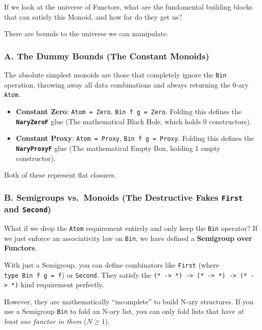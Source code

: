 \documentclass[
]{article}
\providecommand{\tightlist}{%
  \setlength{\itemsep}{0pt}\setlength{\parskip}{0pt}}
\begin{document}
If we look at the universe of Functors, what are the fundamental
building blocks that can satisfy this Monoid, and how far do they get
us?

There are bounds to the universe we can manipulate.

\subsubsection{A. The Dummy Bounds (The Constant
Monoids)}\label{a.-the-dummy-bounds-the-constant-monoids}

The absolute simplest monoids are those that completely ignore the
\texttt{Bin} operation, throwing away all data combinations and always
returning the 0-ary \texttt{Atom}.

\begin{itemize}
\tightlist
\item
  \textbf{Constant Zero}: \texttt{Atom\ =\ Zero},
  \texttt{Bin\ f\ g\ =\ Zero}. Folding this defines the
  \textbf{\texttt{NaryZeroF}} glue (The mathematical Black Hole, which
  holds 0 constructors).
\item
  \textbf{Constant Proxy}: \texttt{Atom\ =\ Proxy},
  \texttt{Bin\ f\ g\ =\ Proxy}. Folding this defines the
  \textbf{\texttt{NaryProxyF}} glue (The mathematical Empty Box, holding
  1 empty constructor).
\end{itemize}

Both of these represent flat closures.

\subsubsection{\texorpdfstring{B. Semigroups vs.~Monoids (The
Destructive Fakes \texttt{First} and
\texttt{Second})}{B. Semigroups vs.~Monoids (The Destructive Fakes First and Second)}}\label{b.-semigroups-vs.-monoids-the-destructive-fakes-first-and-second}

What if we drop the \texttt{Atom} requirement entirely and only keep the
\texttt{Bin} operator? If we just enforce an associativity law on
\texttt{Bin}, we have defined a \textbf{Semigroup over Functors}.

With just a Semigroup, you can define combinators like \texttt{First}
(where \texttt{type\ Bin\ f\ g\ =\ f}) or \texttt{Second}. They satisfy
the
\texttt{(*\ -\textgreater{}\ *)\ -\textgreater{}\ (*\ -\textgreater{}\ *)\ -\textgreater{}\ (*\ -\textgreater{}\ *)}
kind requirement perfectly.

However, they are mathematically ``incomplete'' to build N-ary
structures. If you use a Semigroup \texttt{Bin} to fold an N-ary list,
you can only fold lists that have \emph{at least one functor in them}
(\(N \ge 1\)).
\end{document}
